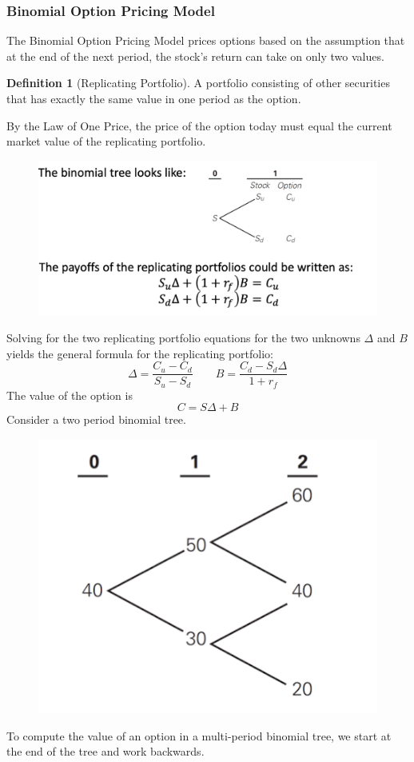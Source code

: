 \documentclass[11pt]{article}
\theoremstyle{definition}
\newtheorem*{definition}{Definition}
\begin{document}
\subsubsection{Binomial Option Pricing Model}
The Binomial Option Pricing Model prices options based on the assumption that at the end of the next period, the stock's return can take on only two values. 
\begin{definition}[Replicating Portfolio]
    A portfolio consisting of other securities that has exactly the same value in one period as the option.
\end{definition}
By the Law of One Price, the price of the option today must equal the current market value of the replicating portfolio.
\begin{figure}[h]
    \centering
    \includegraphics[scale=0.25]{Screenshot 2023-12-13 at 16.47.58.png}
\end{figure}
\newpage
Solving for the two replicating portfolio equations for the two unknowns $\Delta$ and $B$ yields the general formula for the replicating portfolio:
\begin{equation*}
    \Delta = \frac{C_u - C_d}{S_u -S_d} \qquad B = \frac{C_d - S_d\Delta}{1 + r_f}
\end{equation*}
The value of the option is
\begin{equation*}
    C = S\Delta + B
\end{equation*}
Consider a two period binomial tree.
\begin{figure}[h]
    \centering
    \includegraphics[scale=0.3]{Screenshot 2023-12-13 at 16.52.30.png}
\end{figure}
To compute the value of an option in a multi-period binomial tree, we start at the end of the tree and work backwards.
\end{document}
